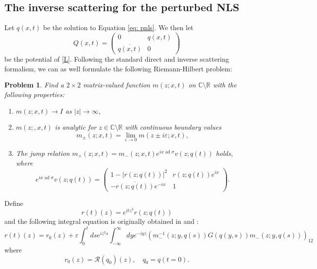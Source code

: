 \documentclass{amsart}
\DeclareMathOperator{\ad}{ad}
\theoremstyle{plain}
\newtheorem{problem}[theorem]{Problem}
\theoremstyle{remark}
\numberwithin{equation}{section}
\newcommand{\Red}[1]{{\color{red} #1}}
\newcommand{\bbC}{\mathbb{C}}
\newcommand{\bbR}{\mathbb{R}}
\newcommand{\twomat}[4]
{
\left(
	\begin{array}{cc}
		{#1}	&	{#2}	\\[10pt]
		{#3}	&	{#4}
		\end{array}
\right)
}
\begin{document}
\subsection{The inverse scattering for the perturbed NLS} Let $q(x,t)$ be the solution to Equation \eqref{eq: pnls}. We then let 
\begin{equation}
    Q(x,t)=\twomat{0}{q(x,t)}{\overline{q(x,t)}}{0}
\end{equation}
be the potential of \eqref{L}. Following the standard direct and inverse scattering formalism, we can as well formulate the following Riemann-Hilbert problem:
\begin{problem}
\label{prob:NLS.RH1}
Find a $2\times 2$ matrix-valued function $m(z;x,t)$ on $\bbC \setminus \bbR$ with the following properties:
\begin{enumerate}
\item		$m(z;x,t) \to I$ as $|z| \to \infty$,
			\medskip
			
\item		$m(z;,x,t)$ is analytic for $z \in \mathbb{C} \setminus \bbR$ with continuous boundary values
			$$m_\pm(z;x,t) = \lim_{\varepsilon \to 0} m(z\pm i\varepsilon;x,t),$$
			\medskip
			
\item		
The jump relation $m_+(z;x,t) = m_	-(z;x,t) e^{ix \ad \sigma} v(z;q(t))$ holds, where
			\begin{equation}
			\label{NLS.V}
			e^{ix\ad \sigma} v(z;q(t))=\twomat{1-|r(z;q(t))|^2}
			{r(z;q(t))e^{ix}}
   {-\overline{r(z;q(t))}e^{-ix}}
   {1}.
			\end{equation}
\end{enumerate}
\end{problem}
Define
\begin{equation}
    r(t)(z)=e^{i t z^2} r(z ; q(t))
\end{equation}
and the following integral equation is originally obtained in \cite{Kaup} and \cite{KN}:
\begin{equation}
\label{eq:r}
    r(t)(z)=r_0(z)+\varepsilon \int_0^t d s e^{i z^2 s} \int_{-\infty}^{\infty} d y e^{-i y z}\left(m_{-}^{-1}(z ; y,q(s)) G(q(y, s)) m_{-}(z ; y, q(s))\right)_{12}
\end{equation}
where
\begin{equation}
    r_0(z)=\mathcal{R}\left(q_0\right)(z), \quad q_0=q(t=0).
\end{equation}
\end{document}
